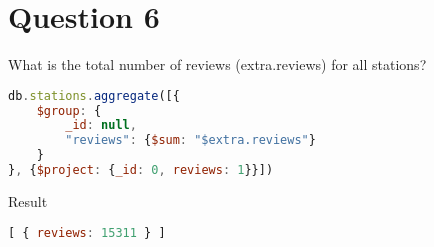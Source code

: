\section{Question 6}

\begin{question}
  What is the total number of reviews (extra.reviews) for all stations?
\end{question}

\begin{answer}

  \begin{lstlisting}[language=js]
db.stations.aggregate([{
    $group: {
        _id: null,
        "reviews": {$sum: "$extra.reviews"}
    }
}, {$project: {_id: 0, reviews: 1}}])
  \end{lstlisting}
  Result
  \begin{lstlisting}[language=js]
[ { reviews: 15311 } ]
  \end{lstlisting}

\end{answer}
